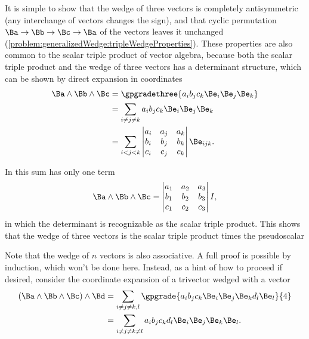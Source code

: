 It is simple to show that the wedge of three vectors is completely antisymmetric (any interchange of vectors changes the sign), and that cyclic permutation \( \Ba \rightarrow \Bb \rightarrow \Bc \rightarrow \Ba \) of the vectors leaves it unchanged
(\cref{problem:generalizedWedge:tripleWedgeProperties}).
These properties are also common to the scalar triple product of  vector algebra, because both the scalar triple product and the wedge of three vectors has a determinant structure, which can be shown by direct expansion in coordinates
\begin{equation}\label{eqn:generalizedWedge:620}
\begin{aligned}
\Ba \wedge \Bb \wedge \Bc
&= \gpgradethree{ a_i b_j c_k \Be_i \Be_j \Be_k } \\
&= \sum_{i \ne j \ne k} a_i b_j c_k \Be_i \Be_j \Be_k \\
&= \sum_{i < j < k}
   \begin{vmatrix}
   a_i & a_j & a_k \\
   b_i & b_j & b_k \\
   c_i & c_j & c_k \\
   \end{vmatrix}
   \Be_{i j k}.
\end{aligned}
\end{equation}

In  this sum has only one term
\begin{equation}\label{eqn:generalizedWedge:680}
\Ba \wedge \Bb \wedge \Bc
=
\begin{vmatrix}
a_1 & a_2 & a_3 \\
b_1 & b_2 & b_3 \\
c_1 & c_2 & c_3 \\
\end{vmatrix}
I,
\end{equation}
in which the determinant is recognizable as the scalar triple product.  This shows that the  wedge of three vectors is the scalar triple product times the pseudoscalar

Note that the wedge of \( n \) vectors is also associative.
A full proof is possible by induction, which won't be done here.
Instead, as a hint of how to proceed if desired,
consider the coordinate expansion of a trivector wedged with a vector
\begin{equation}\label{eqn:generalizedWedge:660}
\begin{aligned}
(\Ba \wedge \Bb \wedge \Bc) \wedge \Bd
&=
\sum_{i \ne j \ne k, l}
\gpgrade{
a_i b_j c_k
\Be_i \Be_j \Be_k
d_l \Be_l
}{4} \\
&=
\sum_{i \ne j \ne k \ne l}
a_i b_j c_k d_l
\Be_i \Be_j \Be_k \Be_l.
\end{aligned}
\end{equation}

